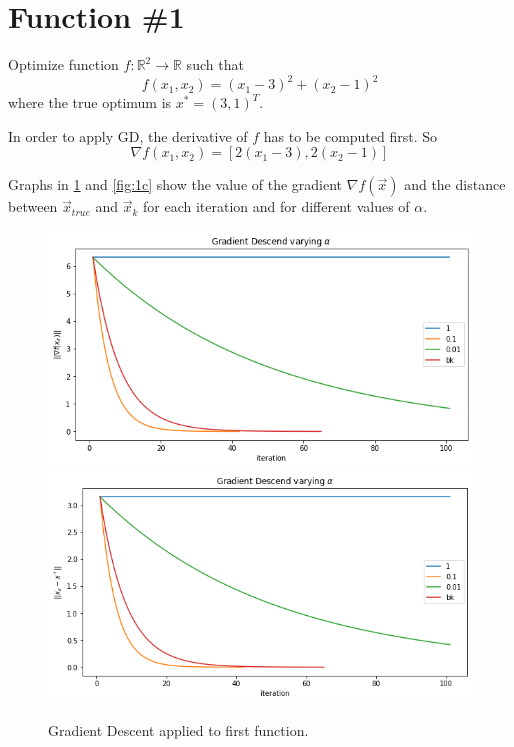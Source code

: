 \documentclass[a4paper,10pt]{report}
\begin{document}
\section{Function \#1}
Optimize function $f:\mathbb{R}^2 \rightarrow \mathbb{R}$ such that
\begin{equation}
  f(x_1,x_2)=(x_1-3)^2+(x_2-1)^2
\end{equation}
where the true optimum is $x^*=(3,1)^T$.

In order to apply GD, the derivative of $f$ has to be computed first. So
\begin{equation}
  \nabla f(x_1,x_2)= [2(x_1-3),2(x_2-1)]
\end{equation}

Graphs in \ref{fig:1} and \ref{fig:1c} show the value of the gradient $\nabla f(\vec{x})$ and the distance between $\vec{x}_{true}$ and $\vec{x}_k$ for each iteration and for different values of $\alpha$.
\begin{figure}[!htb]
    \includegraphics[width=\linewidth]{1_a.png}
  \endminipage\hfill
    \includegraphics[width=\linewidth]{1_k.png}
  \endminipage\hfill
  \caption{Gradient Descent applied to first function.}
  \label{fig:1}
\end{figure}
\end{document}
